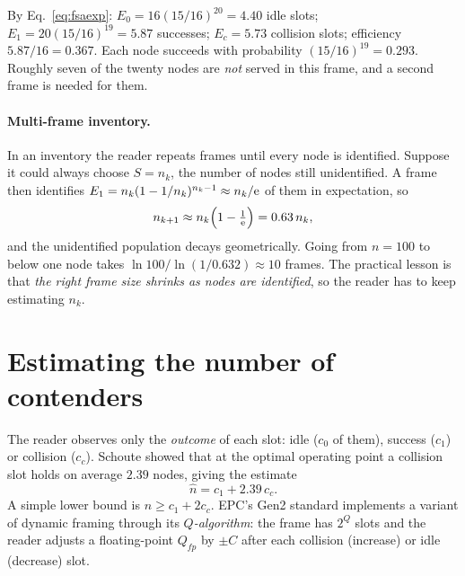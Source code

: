 \begin{example}
By Eq.~\eqref{eq:fsaexp}: $E_0=16(15/16)^{20}=4.40$ idle slots; $E_1=20(15/16)^{19}=5.87$ successes; $E_c=5.73$ collision slots; efficiency $5.87/16=0.367$. Each node succeeds with probability $(15/16)^{19}=0.293$. Roughly seven of the twenty nodes are \emph{not} served in this frame, and a second frame is needed for them.
\end{example}

\paragraph{Multi-frame inventory.}
In an inventory the reader repeats frames until every node is identified. Suppose it could always
choose $S=n_k$, the number of nodes still unidentified. A frame then identifies
$E_1=n_k(1-1/n_k)^{n_k-1}\approx n_k/\mathrm{e}$ of them in expectation, so
\[
 n_{k+1}\approx n_k\Big(1-\tfrac1{\mathrm{e}}\Big)=0.63\,n_k,
\]
and the unidentified population decays geometrically. Going from $n=100$ to below one node takes
$\ln100/\ln(1/0.632)\approx10$ frames. The practical lesson is that \emph{the right frame size shrinks as nodes are identified}, so the reader has to keep estimating $n_k$.

\section{Estimating the number of contenders}
\label{sec:estimate}

The reader observes only the \emph{outcome} of each slot: idle ($c_0$ of them), success ($c_1$) or
collision ($c_c$). Schoute \citep{schoute1983} showed that at the optimal operating point a collision slot holds on average $2.39$ nodes, giving the estimate
\begin{equation}
 \hat n=c_1+2.39\,c_c.
\end{equation}
A simple lower bound is $n\ge c_1+2c_c$. EPC's Gen2 standard \citep{epcgen2} implements a variant of dynamic framing
through its \emph{$Q$-algorithm}: the frame has $2^Q$ slots and the reader adjusts a floating-point $Q_{fp}$ by
$\pm C$ after each collision (increase) or idle (decrease) slot.

